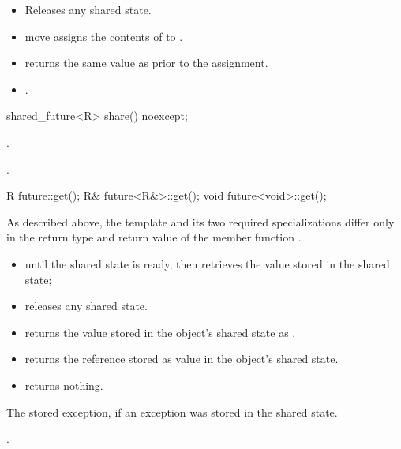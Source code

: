 \begin{itemdescr}
\pnum
\effects
\begin{itemize}
\item
Releases any shared state.
\item
move assigns the contents of  to .
\end{itemize}

\pnum
\ensures
\begin{itemize}
\item
{} returns the same value as  prior to the
assignment.

\item
{}.
\end{itemize}
\end{itemdescr}

%
\begin{itemdecl}
shared_future<R> share() noexcept;
\end{itemdecl}

\begin{itemdescr}
\pnum
\returns
{}.

\pnum
\ensures
{}.
\end{itemdescr}

%
\begin{itemdecl}
R future::get();
R& future<R&>::get();
void future<void>::get();
\end{itemdecl}

\begin{itemdescr}
\pnum
\begin{note}
As described above, the template and its two required specializations differ only in
the return type and return value of the member function .
\end{note}

\pnum
\effects
\begin{itemize}
\item {} until the shared state is ready, then retrieves the
value stored in the shared state;
\item releases any shared state.
\end{itemize}

\pnum
\returns
\begin{itemize}
\item
{} returns the value  stored in the object's shared state as
.

\item
{} returns the reference stored as value in the object's shared state.

\item
{} returns nothing.
\end{itemize}

\pnum
\throws
The stored exception, if an exception was stored in the shared state.

\pnum
\ensures
{}.
\end{itemdescr}

